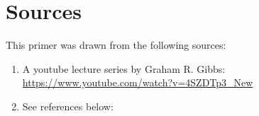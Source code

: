 \documentclass[10pt, letterpaper]{article}
\begin{document}
\section*{Sources}
\label{sec:org4da18e0}
This primer was drawn from the following sources:
\begin{enumerate}
\item A youtube lecture series by Graham R. Gibbs: \url{https://www.youtube.com/watch?v=4SZDTp3\_New}
\item See references below: \cite{charmaz2006constructing}
\end{enumerate}



\end{document}
